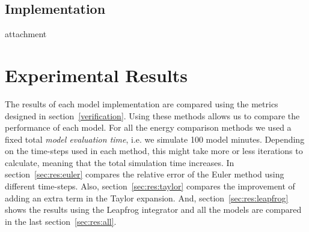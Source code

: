 \documentclass[11pt]{article} %
\begin{document}
\subsection{Implementation}
attachment
\section{Experimental Results}
\label{sec:results}
The results of each model implementation are compared using the metrics designed in section~\ref{verification}. Using these methods allows us to compare the performance of each model. For all the energy comparison methods we used a fixed total \textit{model evaluation time}, i.e. we simulate 100 model minutes. Depending on the time-steps used in each method, this might take more or less iterations to calculate, meaning that the total simulation time increases. In
section~\ref{sec:res:euler} compares the relative error of the Euler method using different time-steps. Also, section~\ref{sec:res:taylor} compares the improvement of adding an extra term in the Taylor expansion. And, section~\ref{sec:res:leapfrog} shows the results using the Leapfrog integrator and all the models are compared in the last section~\ref{sec:res:all}.
\end{document}
